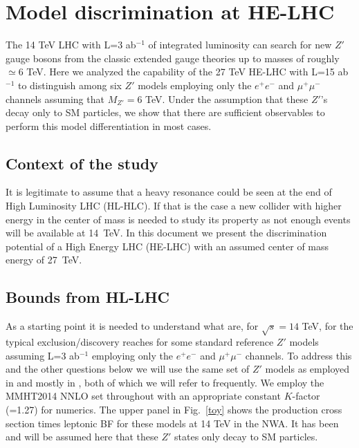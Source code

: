 \section{Model discrimination at HE-LHC}
The 14 TeV LHC with L=3 ab$^{-1}$ of integrated luminosity can search for new $Z'$ gauge bosons from the classic extended gauge theories up to masses 
of roughly $\simeq 6$ TeV.  Here we analyzed the capability of the 27 TeV HE-LHC with L=15 ab$^{-1}$ to distinguish among six $Z'$ models employing only 
the $e^+e^-$ and $\mu^+\mu^-$ channels assuming that $M_{Z'}=6$ TeV. Under the assumption that these $Z'$'s decay only to SM particles,  we show that 
there are sufficient observables to perform this model differentiation in most cases. 

\subsection{Context of the study}
It is legitimate to assume that a heavy resonance could be seen at the end of High Luminosity LHC (HL-HLC). If that is the case a new collider with higher energy 
in the center of mass is needed to study its property as not enough events will be available at 14~TeV. In this document we present the discrimination potential of a High Energy LHC (HE-LHC)
with an assumed center of mass energy of 27~TeV.


\subsection{Bounds from HL-LHC}
As a starting point it is needed to understand what are, for $\sqrt s=14$ TeV, for the typical exclusion/discovery reaches for some standard reference $Z'$ models assuming L=3 ab$^{-1}$ 
employing only the $e^+e^-$ and $\mu^+\mu^-$ channels. To address this and the other questions below we will use the same set of $Z'$ models as employed 
in \cite{Rizzo:2014xma} and mostly in \cite{Han:2013mra}, both of which we will refer to frequently. We employ the MMHT2014 NNLO set \cite{Harland-Lang:2014zoa} 
throughout with an appropriate constant $K$-factor (=1.27) for numerics. 
The upper panel in Fig.~\ref{toy} shows the production cross section times leptonic BF for these models at 14 TeV in the NWA. It has 
been and will be assumed here that these $Z'$ states only decay to SM particles. 

